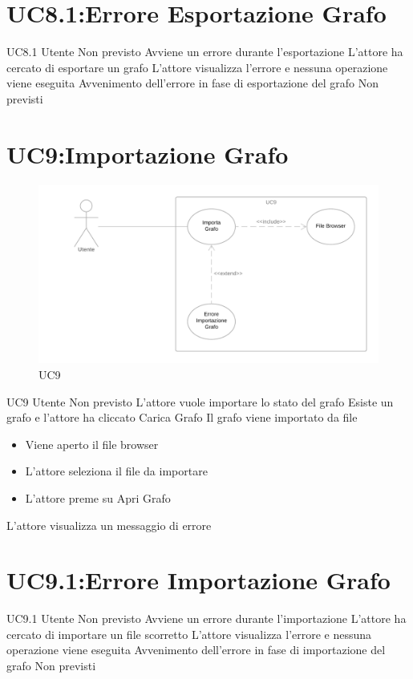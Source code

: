 \documentclass[../AnalisideiRequisiti.tex]{subfiles}
\begin{document}
\section{UC8.1:Errore Esportazione Grafo}
\UserCase
{UC8.1}
{Utente}
{Non previsto}
{Avviene un errore durante l'esportazione}
{L'attore ha cercato di esportare un grafo}
{L'attore visualizza l'errore e nessuna operazione viene eseguita}
{Avvenimento dell'errore in fase di esportazione del grafo}
{Non previsti}

\section{UC9:Importazione Grafo}
\begin{figure}[H]
	\caption{UC9}
	\centering
	\includegraphics[width=\textwidth]{../img/UC09.png}
\end{figure}
\UserCase
{UC9}
{Utente}
{Non previsto}
{L'attore vuole importare lo stato del grafo}
{Esiste un grafo e l'attore ha cliccato Carica Grafo}
{Il grafo viene importato da file}
{
	\begin{itemize}
			\item{} Viene aperto il file browser 
			\item{} L'attore seleziona il file da importare 
			\item{} L'attore preme su Apri Grafo
	\end{itemize}
}
{L'attore visualizza un messaggio di errore }
\section{UC9.1:Errore Importazione Grafo}
\UserCase
{UC9.1}
{Utente}
{Non previsto}
{Avviene un errore durante l'importazione}
{L'attore ha cercato di importare un file scorretto}
{L'attore visualizza l'errore e nessuna operazione viene eseguita}
{Avvenimento dell'errore in fase di importazione del grafo}
{Non previsti}
\end{document}
